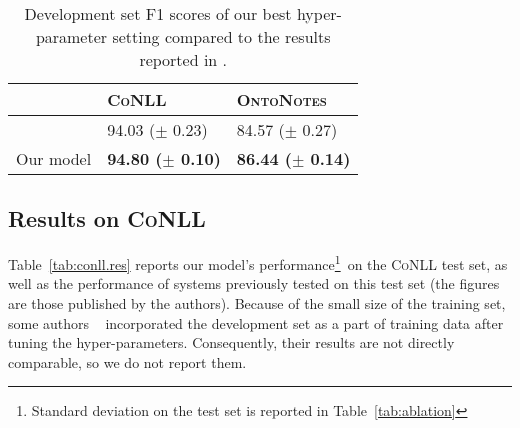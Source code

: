 \documentclass[11pt]{article}
\newcommand{\conll}{\textsc{CoNLL}}
\newcommand{\onto}{\textsc{OntoNotes}}
\begin{document}
	\begin{table}[h]
		\begin{center} 
			\begin{tabular}{|c|l|l|}
				\hline 
				& \textbf{\conll} & \textbf{\onto}\\
				\hline
				\cite{chiu2015named}  & 94.03 ($\pm$ 0.23) & 84.57 ($\pm$ 0.27)\\
				Our model & \bf 94.80 ($\pm$ 0.10) & \bf 86.44 ($\pm$ 0.14) \\
				\hline
			\end{tabular}
		\end{center}
		
		
		\caption{Development set F1 scores of our best hyper-parameter setting compared to the results reported in \cite{chiu2015named}.}
		\label{tab.dev} 
		
	\end{table}
	
	
	\subsection{Results on \conll}
	
	Table~\ref{tab:conll.res} reports our model's performance\footnote{Standard deviation on the test set is reported in Table~\ref{tab:ablation}} on the \conll{ }test set, as well as the performance of systems previously tested on this test set (the figures are those published by the authors). Because of the small size of the training set, some authors ~\cite{chiu2015named,yang2017neural,peters2017semi,peters2018deep} incorporated the development set as a part of training data after tuning the hyper-parameters. Consequently, their results are not directly comparable, so we do not report them.
	
\end{document}
